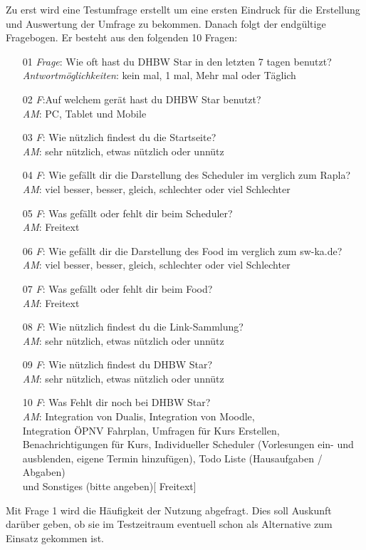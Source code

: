 Zu erst wird eine Testumfrage erstellt um eine ersten Eindruck für die Erstellung und Auswertung der Umfrage zu bekommen.
Danach folgt der endgültige Fragebogen. Er besteht aus den folgenden 10 Fragen:
\begin{itemize}
	\item[01] {\emph{Frage}: Wie oft hast du DHBW Star in den letzten 7 tagen benutzt?\\
		\emph{Antwortmöglichkeiten}: kein mal, 1 mal, Mehr mal oder Täglich}
	\item[02]{\emph{F}:Auf welchem gerät hast du DHBW Star benutzt?\\
		\emph{AM}: PC, Tablet und Mobile}
	\item[03]{\emph{F}: Wie nützlich findest du die Startseite?\\
		\emph{AM}: sehr nützlich, etwas nützlich oder unnütz}
	\item[04]{\emph{F}: Wie gefällt dir die Darstellung des Scheduler im verglich zum Rapla?\\
		\emph{AM}: viel besser, besser, gleich, schlechter oder viel Schlechter}
	\item[05]{\emph{F}: Was gefällt oder fehlt dir beim Scheduler?\\
		\emph{AM}: Freitext}
	\item[06]{\emph{F}: Wie gefällt dir die Darstellung des Food im verglich zum sw-ka.de?\\
		\emph{AM}: viel besser, besser, gleich, schlechter oder viel Schlechter}
	\item[07]{\emph{F}: Was gefällt oder fehlt dir beim Food?\\
		\emph{AM}: Freitext}
	\item[08]{\emph{F}: Wie nützlich findest du die Link-Sammlung?\\
		\emph{AM}: sehr nützlich, etwas nützlich oder unnütz}
	\item[09]{\emph{F}: Wie nützlich findest du DHBW Star?\\
		\emph{AM}: sehr nützlich, etwas nützlich oder unnütz}
	\item[10]{\emph{F}: Was Fehlt dir noch bei DHBW Star?\\
		\emph{AM}: Integration von Dualis, Integration von Moodle,\\ Integration ÖPNV Fahrplan, Umfragen für Kurs Erstellen,\\ Benachrichtigungen für Kurs, Individueller Scheduler (Vorlesungen ein- und ausblenden, eigene Termin hinzufügen), Todo Liste (Hausaufgaben / Abgaben)\\ und Sonstiges (bitte angeben)[ Freitext]}
\end{itemize}
Mit Frage 1 wird die Häufigkeit der Nutzung abgefragt. Dies soll Auskunft darüber geben, ob sie im Testzeitraum eventuell schon als Alternative zum Einsatz gekommen ist.

